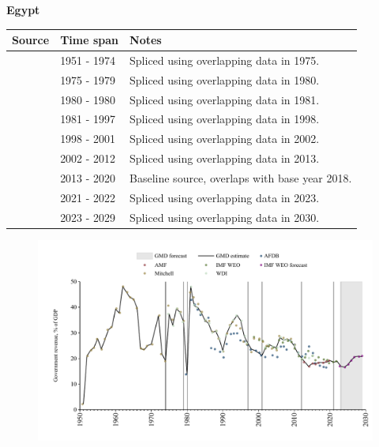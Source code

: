 \documentclass[12pt,a4paper,landscape]{article}
\begin{document}
\begin{adjustbox}{max totalsize={\paperwidth}{\paperheight},center}
\begin{minipage}[t][\textheight][t]{\textwidth}
\vspace*{0.5cm}
{}
\begin{center}
{\Large\bfseries Egypt}
\end{center}
\vspace{0.5cm}
\begin{table}[H]
\centering
\small
\begin{tabular}{|l|l|l|}
\hline
\textbf{Source} & \textbf{Time span} & \textbf{Notes} \\
\hline
\rowcolor{white}\cite{Mitchell}& 1951 - 1974 &Spliced using overlapping data in 1975.\\
\rowcolor{lightgray}\cite{WDI}& 1975 - 1979 &Spliced using overlapping data in 1980.\\
\rowcolor{white}\cite{AFDB}& 1980 - 1980 &Spliced using overlapping data in 1981.\\
\rowcolor{lightgray}\cite{WDI}& 1981 - 1997 &Spliced using overlapping data in 1998.\\
\rowcolor{white}\cite{AFDB}& 1998 - 2001 &Spliced using overlapping data in 2002.\\
\rowcolor{lightgray}\cite{WDI}& 2002 - 2012 &Spliced using overlapping data in 2013.\\
\rowcolor{white}\cite{AMF}& 2013 - 2020 &Baseline source, overlaps with base year 2018.\\
\rowcolor{lightgray}\cite{IMF_WEO}& 2021 - 2022 &Spliced using overlapping data in 2023.\\
\rowcolor{white}\cite{IMF_WEO_forecast}& 2023 - 2029 &Spliced using overlapping data in 2030.\\
\hline
\end{tabular}
\end{table}
\begin{figure}[H]
\centering
\includegraphics[width=\textwidth,height=0.6\textheight,keepaspectratio]{graphs/EGY_govrev_GDP.pdf}
\end{figure}
\end{minipage}
\end{adjustbox}
\end{document}
